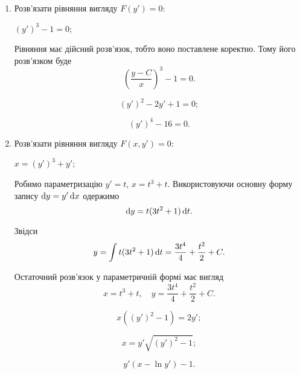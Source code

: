 \begin{enumerate}
	\item Розв'язати рівняння вигляду $F(y') = 0$:
	\begin{example}
		$(y')^3 - 1 = 0$;
	\end{example}
	
	\begin{solution}
		Рівняння має дійсний розв'язок, тобто воно поставлене коректно. Тому його розв'язком буде \[\left(\frac{y - C}{x}\right)^3 - 1 = 0.\]
	\end{solution}
	
	\begin{multicols}{2}
		\begin{problem}
			\[(y')^2 - 2 y' + 1 = 0;\]
		\end{problem}
		
		\begin{problem}
			\[ (y')^4 - 16 = 0. \]
		\end{problem}
	\end{multicols}

	\item Розв'язати рівняння вигляду $F(x, y') = 0$:
	\begin{example}
		$x = (y')^3 + y'$;
	\end{example}
	
	\begin{solution}
		Робимо параметризацію $y' = t$, $x = t^3 + t$. Використовуючи основну форму запису $\mathop{}\!\mathrm{d} y = y' \mathop{}\!\mathrm{d} x$ одержимо \[ \mathop{}\!\mathrm{d} y = t (3t^2 + 1) \mathop{}\!\mathrm{d} t.\]
	
		Звідси \[ y = \int t (3t^2 + 1) \mathop{}\!\mathrm{d} t = \frac{3t^4}{4} + \frac{t^2}{2} + C.\]
	
		Остаточний розв'язок у параметричній формі має вигляд\[ x = t^3 + t, \quad y = \frac{3t^4}{4} + \frac{t^2}{2} + C.\]
	\end{solution}

	\begin{multicols}{2}
		\begin{problem}
			\[ x ((y')^2 - 1) = 2y'; \]
		\end{problem}
		
		\begin{problem}
			\[ x = y' \sqrt{(y')^2 - 1}; \]
		\end{problem}
		
		\begin{problem}
		 	\[ y' (x - \ln y') - 1. \]
		\end{problem}
	\end{multicols}


\end{enumerate}
